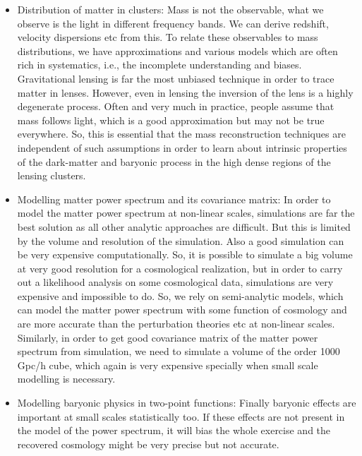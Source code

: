 \begin{itemize}
	\item Distribution of matter in clusters: Mass is not the observable, what we 
			observe is the light in different frequency bands. We can derive 
			redshift, velocity dispersions etc from this. To relate these observables
			to mass distributions, we have approximations and various models which
			are often rich in systematics, i.e., the incomplete understanding and 
			biases. Gravitational lensing is far the most unbiased technique in order
			to trace matter in lenses. However, even in lensing the inversion of the lens
			is a highly degenerate process. Often and very much in 
			practice, people assume that mass follows light, which is a good approximation
			but may not be true everywhere. So, this is essential that the 
			mass reconstruction techniques are independent of such assumptions in order
			to learn about intrinsic properties of the dark-matter and baryonic
			process in the high dense regions of the lensing clusters.

	\item Modelling matter power spectrum and its covariance matrix: In order to model
			the matter power spectrum at non-linear scales, simulations are far the 
			best solution as all other analytic approaches are difficult. But this is limited
			by the volume and resolution of the simulation. Also a good simulation
			can be very expensive computationally. So, it is possible to simulate a big
			volume at very good resolution for a cosmological realization, but in order
			to carry out a likelihood analysis on some cosmological data, simulations are
			very expensive and impossible to do. So, we rely on semi-analytic models, 
			which can model the matter power spectrum with some function of cosmology
			and are more accurate than the perturbation theories etc at non-linear 
			scales. Similarly, in order to get good covariance matrix of the matter power
			spectrum from simulation, we need to simulate a volume of the order 1000 Gpc/h
			cube, which again is very expensive specially when small scale modelling 
			is necessary. 

	\item Modelling baryonic physics in two-point functions: Finally baryonic effects are 
			important at small scales statistically too. If these effects are not present
			in the model of the power spectrum, it will bias the whole exercise and
			the recovered cosmology might be very precise but not accurate. 
\end{itemize}

